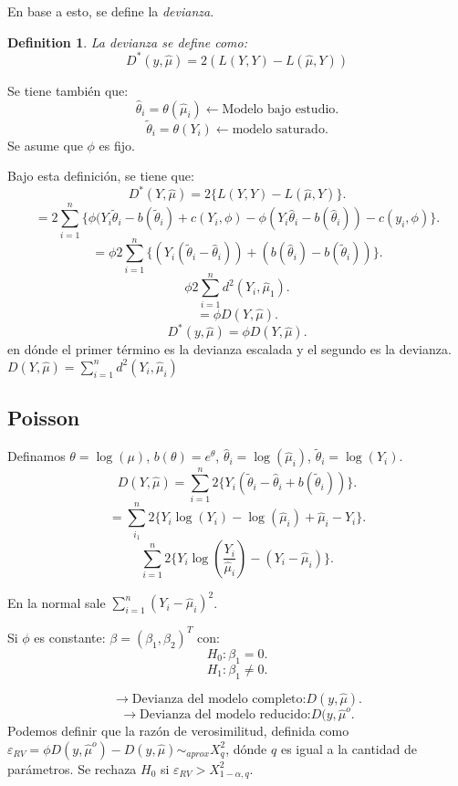 \documentclass{article}
\newtheorem{mydef}{Definition}
\begin{document}
En base a esto, se define la \textit{devianza}.

\begin{mydef}
La devianza se define como:
\[ D^{*}{(y,\hat{\mu})}=2{(L{(Y,Y)}-L{(\hat{\mu},Y)})}\]
\end{mydef}

Se tiene también que:
\[ \hat{\theta}_{i}=\theta{(\hat{\mu}_{i})} \leftarrow \text{Modelo bajo estudio}.\]
\[ \tilde{\theta}_{i}=\theta{(Y_{i})} \leftarrow \text{modelo saturado}.\]
Se asume que $\phi$ es fijo.

Bajo esta definición, se tiene que:
\[ D^{*}{(Y,\hat{\mu})}=2\{L{(Y,Y)}-L{(\hat{\mu},Y)}\}.\]
\[ =2\sum_{i=1}^{n}\{\phi{(Y_{i}\tilde{\theta}_{i}-b(\tilde{\theta}_{i})}+c{(Y_{i},\phi)}-\phi{(Y_{i}\hat{\theta}_{i}-b{(\hat{\theta}_{i})})-c{(y_{i},\phi)}}\}.\]
\[ =\phi 2 \sum_{i=1}^{n}\{{(Y_{i}{(\tilde{\theta}_{i}-\hat{\theta}_{i})})}+{(b{(\hat{\theta}_{i})-b{(\tilde{\theta}_{i})}})}\}.\]
\[ \phi 2 \sum_{i=1}^{n}d^{2}{(Y_{i},\hat{\mu}_{1})}.\]
\[ =\phi D{(Y,\hat{\mu})}.\]
\[ D^{*}{(y,\hat{\mu})}=\phi D{(Y,\hat{\mu})}.\]
en dónde el primer término es la devianza escalada y el segundo es la devianza. $D{(Y,\hat{\mu})}=\sum_{i=1}^{n}d^{2}{(Y_{i},\hat{\mu}_{i})}$

\subsection{Poisson}
Definamos $\theta=\log{(\mu)}$, $b{(\theta)}=e^{\theta}$, $\hat{\theta}_{i}=\log{(\hat{\mu}_{i})}$, $\tilde{\theta}_{i}=\log{(Y_{i})}$.
\[ D(Y,\hat{\mu})=\sum_{i=1}^{n}2\{Y_{i}{(\tilde{\theta}_{i}-\hat{\theta}_{i}+b{(\tilde{\theta}_{i})})}\}.\]
\[ = \sum_{i_1}^{n}2 \{Y_{i} \log{(Y_{i})}-\log{(\hat{\mu}_{i})}+\hat{\mu}_{i}-Y_{i}\}.\]
\[ \sum_{i=1}^{n}2\{Y_{i}\log{(\frac{Y_{i}}{\hat{\mu}_{i}})}-{(Y_{i}-\hat{\mu}_{i})}\}.\]

En la normal sale $\sum_{i=1}^{n}{(Y_{i}-\hat{\mu}_{i})}^{2}$.

Si $\phi$ es constante: $\beta={(\beta_{1},\beta_{2})}^{T}$ con:
\[ H_{0}: \beta_{1} = 0.\]
\[ H_{1}: \beta_{1} \neq 0.\]

\[ \rightarrow \text{Devianza del modelo completo:} D(y,\hat{\mu}).\]
\[ \rightarrow \text{Devianza del modelo reducido:} D(y,\hat{\mu}^{o}.\]
Podemos definir que la razón de verosimilitud, definida como $\varepsilon_{RV}=\phi{D{(y,\hat{\mu}^{o})}-D{(y,\hat{\mu})}}\sim_{aprox} X^{2}_{q}$, dónde $q$ es igual a la cantidad de parámetros. Se rechaza $H_{0}$ si $\varepsilon_{RV} > X^{2}_{1-\alpha,q}$.
\end{document}
